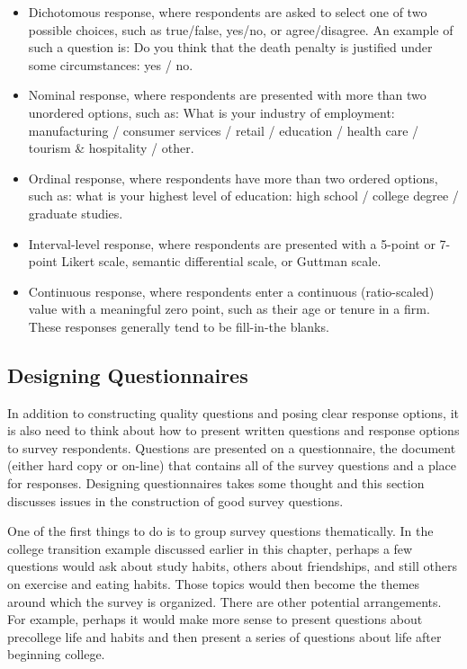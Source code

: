 \begin{itemize}
	\item Dichotomous response, where respondents are asked to select one of two possible choices, such as true/false, yes/no, or agree/disagree. An example of such a question is: Do you think that the death penalty is justified under some circumstances: yes / no.

	\item Nominal response, where respondents are presented with more than two unordered options, such as: What is your industry of employment: manufacturing / consumer services / retail / education / health care / tourism \& hospitality / other.

	\item Ordinal response, where respondents have more than two ordered options, such as: what is your highest level of education: high school / college degree / graduate studies.

	\item Interval-level response, where respondents are presented with a 5-point or 7-point Likert scale, semantic differential scale, or Guttman scale. 

	\item Continuous response, where respondents enter a continuous (ratio-scaled) value with a meaningful zero point, such as their age or tenure in a firm. These responses generally tend to be fill-in-the blanks.
\end{itemize}

\subsection{Designing Questionnaires}

In addition to constructing quality questions and posing clear response options, it is also need to think about how to present written questions and response options to survey respondents. Questions are presented on a questionnaire, the document (either hard copy or on-line) that contains all of the survey questions and a place for responses. Designing questionnaires takes some thought and this section discusses issues in the construction of good survey questions.

One of the first things to do is to group survey questions thematically. In the college transition example discussed earlier in this chapter, perhaps a few questions would ask about study habits, others about friendships, and still others on exercise and eating habits. Those topics would then become the themes around which the survey is organized. There are other potential arrangements. For example, perhaps it would make more sense to present questions about precollege life and habits and then present a series of questions about life after beginning college.

